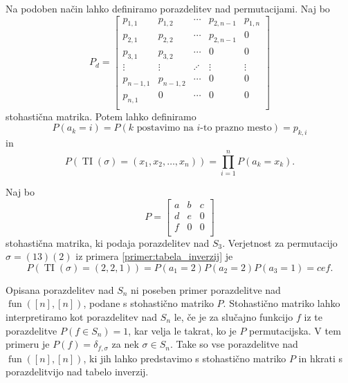 \documentclass[mat2, tisk]{fmfdelo}
\newcommand{\TODO}[1]{{\color{blue} TODO: #1}}
\newcommand{\fun}{\operatorname{fun}}
\newcommand{\funnn}[1]{\fun([#1], [#1])}
\begin{document}
Na podoben način lahko definiramo porazdelitev nad permutacijami.
Naj bo
$$P_d =
\begin{bmatrix}
  p_{1,1} & p_{1,2} & \dotsm & p_{2, n-1} & p_{1,n} \\
  p_{2,1} & p_{2,2} & \dotsm & p_{2, n-1} & 0 \\
  p_{3,1} & p_{3,2} & \dotsm & 0 & 0 \\
  \vdots & \vdots & \iddots & \vdots & \vdots    \\
  p_{n-1,1} & p_{n-1,2}  & \dotsm & 0  & 0\\
  p_{n,1} & 0  & \dotsm & 0  & 0\\
\end{bmatrix}$$
stohastična matrika. Potem lahko definiramo
$$P(a_k = i) = P(k \text{ postavimo na } i\text{-to prazno
mesto}) = p_{k, i}$$
in
$$P(\operatorname{TI}(\sigma) = (x_1, x_2, \dotsc, x_n)) = \prod_{i=1}^n
P(a_k = x_k).$$
\begin{primer}
  Naj bo
  $$
  P =
  \begin{bmatrix}
    a & b & c \\
    d & e & 0 \\
    f & 0 & 0 \\
  \end{bmatrix}
  $$
  stohastična matrika, ki podaja porazdelitev nad $S_3$.
  Verjetnost za permutacijo $\sigma = (13)(2)$ iz primera
  \ref{primer:tabela_inverzij} je
  $$P(\operatorname{TI}(\sigma) = (2, 2, 1)) = P(a_1 = 2) P(a_2 = 2)
  P(a_3 = 1) = cef.$$
\end{primer}
%
%
%
%
\begin{opomba}
  Opisana porazdelitev nad $S_n$ ni poseben primer porazdelitve
  nad $\funnn{n}$, podane s stohastično matriko $P$. Stohastično matriko lahko
  interpretiramo kot porazdelitev nad $S_n$ le, če je za
  slučajno funkcijo $f$ iz te porazdelitve
  $P(f \in S_n) = 1$, kar velja le takrat, ko je $P$ permutacijska. V tem
  primeru je $P(f) = \delta_{f, \sigma}$ za nek $\sigma \in S_n$.
  Take so vse porazdelitve
  nad $\funnn{n}$, ki jih lahko predstavimo s stohastično matriko $P$ in hkrati
  s porazdelitvijo nad tabelo inverzij.
\end{opomba}
\end{document}
